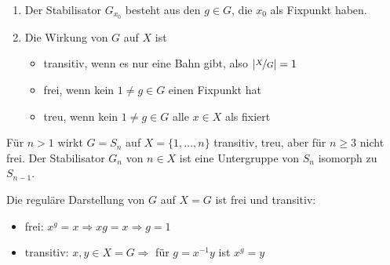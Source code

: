 \begin{remark}
	\begin{enumerate}[label=(\alph*)]
		\item Der Stabilisator $G_{x_0}$ besteht aus den $g\in G$, die $x_0$ als Fixpunkt haben.
		\item Die Wirkung von $G$ auf $X$ ist
		\begin{itemize}
			\item transitiv, wenn es nur eine Bahn gibt, also $\vert\nicefrac{X}{G}\vert = 1$
			\item frei, wenn kein $1\neq g\in G$ einen Fixpunkt hat
			\item treu, wenn kein $1\neq g\in G$ alle $x\in X$ als fixiert
		\end{itemize}
	\end{enumerate}
\end{remark}

\begin{example}
	Für $n>1$ wirkt $G=S_n$ auf $X=\{1,...,n\}$ transitiv, treu, aber für $n\ge 3$ nicht frei. Der Stabilisator $G_n$ von $n\in X$ ist eine Untergruppe von $S_n$ isomorph zu $S_{n-1}$.
\end{example}

\begin{example}
	Die reguläre Darstellung von $G$ auf $X=G$ ist frei und transitiv:
	\begin{itemize}
		\item frei: $x^g=x\Rightarrow xg=x\Rightarrow g=1$
		\item transitiv: $x,y\in X=G\Rightarrow$ für $g=x^{-1}y$ ist $x^g=y$
	\end{itemize}
\end{example}

